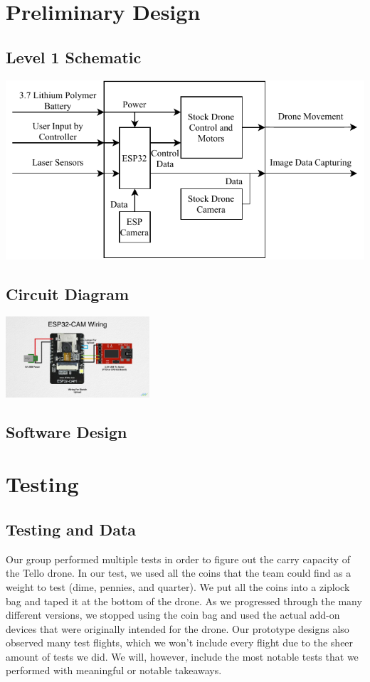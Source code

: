 \documentclass[12pt]{article}
\begin{document}
    \newpage
    \section{Preliminary Design}
        \subsection{Level 1 Schematic}
            \centerline{\includegraphics{./resources/level1.pdf}}
        \subsection{Circuit Diagram}
            \includegraphics[width=0.4\textwidth]{resources/esp32cam_wiring.jpg}
        \subsection{Software Design}
    
    \newpage
    \section{Testing}
        \subsection*{Testing and Data}
            Our group performed multiple tests in order to figure out the carry capacity of the Tello drone.
            In our test, we used all the coins that the team could find as a weight to test (dime, pennies, and quarter).
            We put all the coins into a ziplock bag and taped it at the bottom of the drone.
            As we progressed through the many different versions, we stopped using the coin bag and used the actual add-on devices that were originally intended for the drone.
            Our prototype designs also observed many test flights, which we won't include every flight due to the sheer amount of tests we did.
            We will, however, include the most notable tests that we performed with meaningful or notable takeaways.
\end{document}
